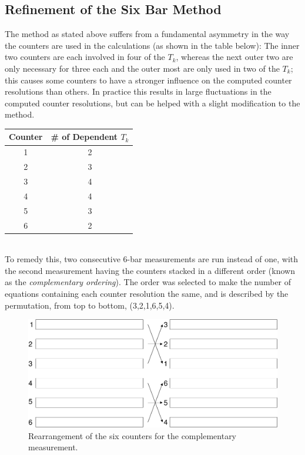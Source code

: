 \subsection{Refinement of the Six Bar Method}
The method as stated above suffers from a fundamental asymmetry in the
way the counters are used in the calculations (as shown in the table
below): The inner two counters are each involved in four of the $T_k$,
whereas the next outer two are only necessary for three each and the
outer most are only used in two of the $T_k$; this causes some
counters to have a stronger influence on the computed counter
resolutions than others.  In practice this results in large
fluctuations in the computed counter resolutions, but can be helped
with a slight modification to the method.\\

\begin{tabular}[c]{c || c}
  Counter & \# of Dependent $T_k$ \\ \hline
  1 & 2\\
  2 & 3\\
  3 & 4\\
  4 & 4\\
  5 & 3\\
  6 & 2\\
\end{tabular}\\

To remedy this, two consecutive 6-bar measurements are run instead of
one, with the second measurement having the counters stacked in a
different order (known as the \textit{complementary ordering}).  The
order was selected to make the number of equations containing each
counter resolution the same, and is described by the permutation, from
top to bottom, (3,2,1,6,5,4).

\begin{figure}[H]
  \centering
  \includegraphics[width=15cm]{gary/fig_gary_six_bar_refinement/complementary.png}
  \caption{Rearrangement of the six counters for the complementary
    measurement.}
  \label{complementary}
\end{figure}

